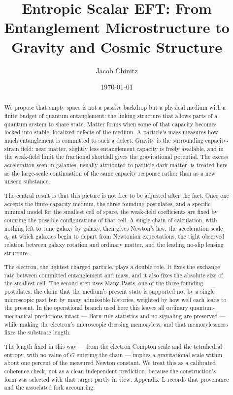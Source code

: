 \documentclass[11pt]{article}
\author{Jacob Chinitz}
\title{Entropic Scalar EFT: From Entanglement Microstructure to Gravity and Cosmic Structure}
\date{\today}
\begin{document}
\maketitle

\begin{abstract}
\indent We propose that empty space is not a passive backdrop but a physical medium with a finite budget of quantum entanglement: the linking structure that allows parts of a quantum system to share state. Matter forms when some of that capacity becomes locked into stable, localized defects of the medium. A particle's mass measures how much entanglement is committed to such a defect. Gravity is the surrounding capacity-strain field: near matter, slightly less entanglement capacity is freely available, and in the weak-field limit the fractional shortfall gives the gravitational potential. The excess acceleration seen in galaxies, usually attributed to particle dark matter, is treated here as the large-scale continuation of the same capacity response rather than as a new unseen substance.

\indent The central result is that this picture is not free to be adjusted after the fact. Once one accepts the finite-capacity medium, the three founding postulates, and a specific minimal model for the smallest cell of space, the weak-field coefficients are fixed by counting the possible configurations of that cell. A single chain of calculation, with nothing left to tune galaxy by galaxy, then gives Newton's law, the acceleration scale $a_0$ at which galaxies begin to depart from Newtonian expectations, the tight observed relation between galaxy rotation and ordinary matter, and the leading no-slip lensing structure.

\indent The electron, the lightest charged particle, plays a double role. It fixes the exchange rate between committed entanglement and mass, and it also fixes the absolute size of the smallest cell. The second step uses Many-Pasts, one of the three founding postulates: the claim that the medium's present state is supported not by a single microscopic past but by many admissible histories, weighted by how well each leads to the present. In the operational branch used here this leaves all ordinary quantum-mechanical predictions intact --- Born-rule statistics and no-signaling are preserved --- while making the electron's microscopic dressing memoryless, and that memorylessness fixes the substrate length.

\indent The length fixed in this way --- from the electron Compton scale and the tetrahedral entropy, with no value of $G$ entering the chain --- implies a gravitational scale within about one percent of the measured Newton constant. We treat this as a calibrated coherence check, not as a clean independent prediction, because the construction's form was selected with that target partly in view. Appendix~L records that provenance and the associated fork accounting.


\end{abstract}
\end{document}
